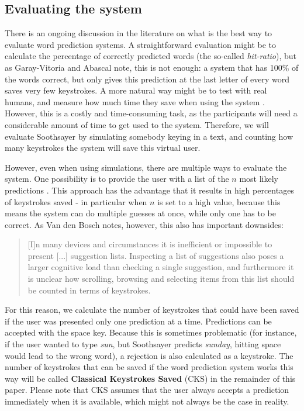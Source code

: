 \documentclass[12pt]{article}
\begin{document}
\subsection{Evaluating the system} \label{evaluation}

There is an ongoing discussion in the literature on what is the best way to evaluate word prediction systems. A straightforward evaluation might be to calculate the percentage of correctly predicted words (the so-called \emph{hit-ratio}), but as Garay-Vitoria and Abascal \citeyear{Garay-Vitoria+06} note, this is not enough: a system that has 100\% of the words correct, but only gives this prediction at the last letter of every word saves very few keystrokes. A more natural way might be to test with real humans, and measure how much time they save when using the system \cite{carlberger+97,koester+98,Garay-Vitoria+06}. However, this is a costly and time-consuming task, as the participants will need a considerable amount of time to get used to the system. Therefore, we will evaluate Soothsayer by simulating somebody keying in a text, and counting how many keystrokes the system will save this virtual user. 

However, even when using simulations, there are multiple ways to evaluate the system. One possibility is to provide the user with a list of the $n$ most likely predictions \cite{Lesher+99,Fazly+03}. This approach has the advantage that it results in high percentages of keystrokes saved - in particular when $n$ is set to a high value, because this means the system can do multiple guesses at once, while only one has to be correct. As Van den Bosch \citeyear{vandenbosch11} notes, however, this also has important downsides: 

\begin{quotation}
[I]n many devices and circumstances it is inefficient or impossible to present [...] suggestion lists. Inspecting a list of suggestions also poses a larger cognitive load than checking a single suggestion, and furthermore it is unclear how scrolling, browsing and selecting items from this list should be counted in terms of keystrokes.
\end{quotation}

For this reason, we calculate the number of keystrokes that could have been saved if the user was presented only one prediction at a time. Predictions can be accepted with the space key. Because this is sometimes problematic (for instance, if the user wanted to type \emph{sun}, but Soothsayer predicts \emph{sunday}, hitting space would lead to the wrong word), a rejection is also calculated as a keystroke. The number of keystrokes that can be saved if the word prediction system works this way will be called \textbf{Classical Keystrokes Saved} (CKS) in the remainder of this paper. Please note that CKS assumes that the user always accepts a prediction immediately when it is available, which might not always be the case in reality.
\end{document}
